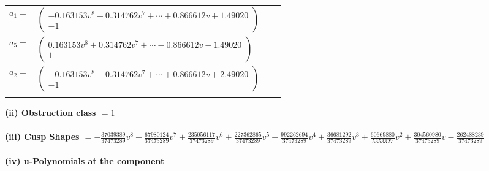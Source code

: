 \documentclass[1p]{elsarticle_modified}
\theoremstyle{definition}
\begin{document}
\begin{tabular}{m{7pt} m{180pt} m{7pt} m{180pt} }
\flushright $a_{1}=$&$\begin{pmatrix}-0.163153 v^{8}-0.314762 v^{7}+\cdots+0.866612 v+1.49020\\-1\end{pmatrix}$ \\
\flushright $a_{5}=$&$\begin{pmatrix}0.163153 v^{8}+0.314762 v^{7}+\cdots-0.866612 v-1.49020\\1\end{pmatrix}$ \\
\flushright $a_{2}=$&$\begin{pmatrix}-0.163153 v^{8}-0.314762 v^{7}+\cdots+0.866612 v+2.49020\\-1\end{pmatrix}$\\&\end{tabular}
\flushleft \textbf{(ii) Obstruction class $= 1$}\\~\\
\flushleft \textbf{(iii) Cusp Shapes $= -\frac{37039389}{37473289} v^8-\frac{67980124}{37473289} v^7+\frac{235056117}{37473289} v^6+\frac{227362865}{37473289} v^5-\frac{992262694}{37473289} v^4+\frac{36681292}{37473289} v^3+\frac{60669880}{5353327} v^2+\frac{304560980}{37473289} v-\frac{262488239}{37473289}$}\\~\\
\newpage\renewcommand{\arraystretch}{1}
\flushleft \textbf{(iv) u-Polynomials at the component}\newline \\
\end{document}
